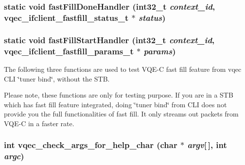 \subsubsection{\setlength{\rightskip}{0pt plus 5cm}static void fast\-Fill\-Done\-Handler (int32\_\-t {\em context\_\-id}, \bf{vqec\_\-ifclient\_\-fastfill\_\-status\_\-t} $\ast$ {\em status})\hspace{0.3cm}{\tt  [static]}}\label{vqec__cli__register_8c_f8b7d1367885800a50d2e1bb78c09db5}


\subsubsection{\setlength{\rightskip}{0pt plus 5cm}static void fast\-Fill\-Start\-Handler (int32\_\-t {\em context\_\-id}, \bf{vqec\_\-ifclient\_\-fastfill\_\-params\_\-t} $\ast$ {\em params})\hspace{0.3cm}{\tt  [static]}}\label{vqec__cli__register_8c_c1a99a6c442090814bf9c04596d1a1bf}


The following three functions are used to test VQE-C fast fill feature from vqec CLI \char`\"{}tuner bind\char`\"{}, without the STB.

Please note, these functions are only for testing purpose. If you are in a STB which has fast fill feature integrated, doing \char`\"{}tuner bind\char`\"{} from CLI does not provide you the full functionalities of fast fill. It only streams out packets from VQE-C in a faster rate. 
\subsubsection{\setlength{\rightskip}{0pt plus 5cm}int vqec\_\-check\_\-args\_\-for\_\-help\_\-char (char $\ast$ {\em argv}[$\,$], int {\em argc})}\label{vqec__cli__register_8c_3d9370d980d4cd61197514609e8f7f2b}


